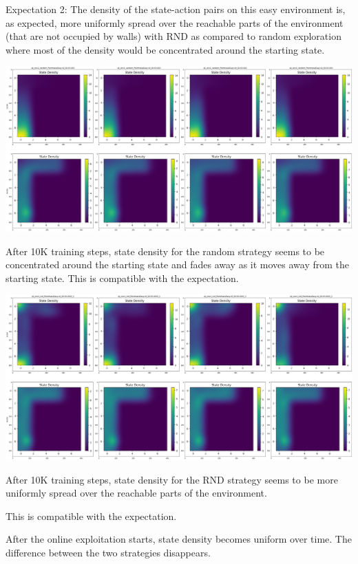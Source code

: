 \documentclass[11pt]{article}
\begin{document}
    Expectation 2: The density of the state-action pairs on this easy environment is, as expected, more uniformly spread over the reachable parts of the environment (that are not occupied by walls) with RND as compared to random exploration where most of the density would be concentrated around the starting state.

    \hspace*{-0.6in}
    \includegraphics[scale=0.20]{p1/q1-easy-state-density-random}

    After 10K training steps, state density for the random strategy seems to be concentrated around the starting state and fades away as it moves away from the starting state.
    This is compatible with the expectation.

    \hspace*{-0.6in}
    \includegraphics[scale=0.20]{p1/q1-easy-state-density-rnd}

    After 10K training steps, state density for the RND strategy seems to be more uniformly spread over the reachable parts of the environment.

    This is compatible with the expectation.

    After the online exploitation starts, state density becomes uniform over time.
    The difference between the two strategies disappears.
\end{document}
